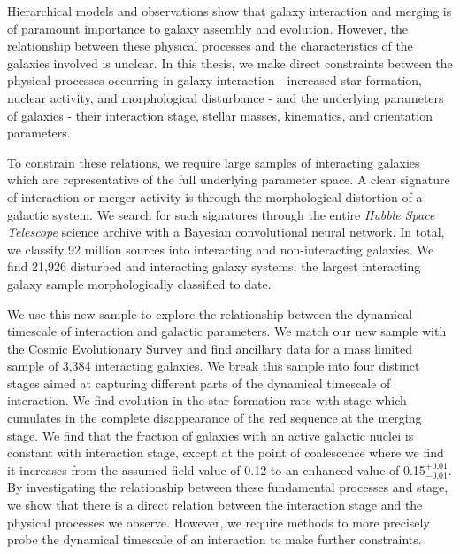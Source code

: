 

\begin{abstracts}        %
Hierarchical models and observations show that galaxy interaction and merging is of paramount importance to galaxy assembly and evolution. However, the relationship between these physical processes and the characteristics of the galaxies involved is unclear. In this thesis, we make direct constraints between the physical processes occurring in galaxy interaction - increased star formation, nuclear activity, and morphological disturbance - and the underlying parameters of galaxies - their interaction stage, stellar masses, kinematics, and orientation parameters. 

To constrain these relations, we require large samples of interacting galaxies which are representative of the full underlying parameter space. A clear signature of interaction or merger activity is through the morphological distortion of a galactic system. We search for such signatures through the entire \emph{Hubble Space Telescope} science archive with a Bayesian convolutional neural network. In total, we classify 92 million sources into interacting and non-interacting galaxies. We find 21,926 disturbed and interacting galaxy systems; the largest interacting galaxy sample morphologically classified to date. 

We use this new sample to explore the relationship between the dynamical timescale of interaction and galactic parameters. We match our new sample with the Cosmic Evolutionary Survey and find ancillary data for a mass limited sample of 3,384 interacting galaxies. We break this sample into four distinct stages aimed at capturing different parts of the dynamical timescale of interaction. We find evolution in the star formation rate with stage which cumulates in the complete disappearance of the red sequence at the merging stage. We find that the fraction of galaxies with an active galactic nuclei is constant with interaction stage, except at the point of coalescence where we find it increases from the assumed field value of 0.12 to an enhanced value of 0.15$^{+0.01}_{-0.01}$. By investigating the relationship between these fundamental processes and stage, we show that there is a direct relation between the interaction stage and the physical processes we observe. However, we require methods to more precisely probe the dynamical timescale of an interaction to make further constraints.


\end{abstracts}

